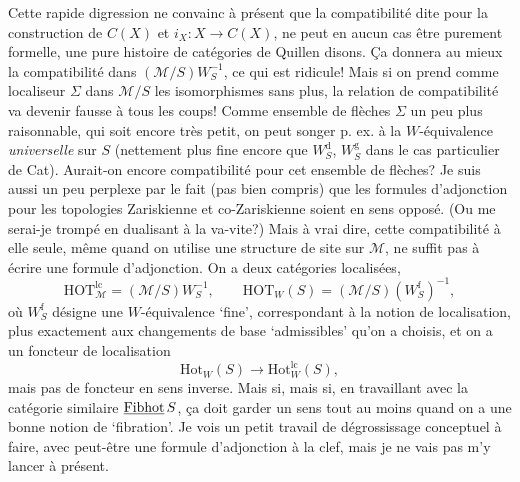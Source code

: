 Cette rapide digression ne convainc à présent que la compatibilité dite pour la construction de $C(X)$ et $i_X : X \longrightarrow C(X)$, ne peut en aucun cas être purement formelle, une pure histoire de catégories de Quillen disons. Ça donnera au mieux la compatibilité dans $(\mathcal{M}/S)W_S^{-1}$, ce qui est ridicule! Mais si on prend comme localiseur $\Sigma$ dans $\mathcal{M}/S$ les isomorphismes sans plus, la relation de compatibilité va devenir fausse à tous les coups! Comme ensemble de flèches $\Sigma$ un peu plus raisonnable, qui soit encore très petit, on peut songer p. ex. à la $W$-équivalence \textit{universelle} sur $S$ (nettement plus fine encore que $W_S^{\mathrm{d}}$, $W_S^{\mathrm{g}}$ dans le cas particulier de Cat). Aurait-on encore compatibilité pour cet ensemble de flèches? Je suis aussi un peu perplexe par le fait (pas bien compris) que les formules d’adjonction pour les topologies Zariskienne et co-Zariskienne soient en sens opposé. (Ou me serai-je trompé en dualisant à la va-vite?) Mais à vrai dire, cette compatibilité à elle seule, même quand on utilise une structure de site sur $\mathcal{M}$, ne suffit pas à écrire une formule d’adjonction. On a deux catégories localisées, %
\[
\mathrm{HOT}^{\mathrm{lc}}_{\mathcal{M}} = (\mathcal{M}/S)W_S^{-1}, \qquad \mathrm{HOT}_W(S) = (\mathcal{M}/S)(W_S^{\mathrm{f}})^{-1},
\]
où $W_S^{\mathrm{f}}$ désigne une $W$-équivalence ‘fine’, correspondant à la notion de localisation, plus exactement aux changements de base ‘admissibles’ qu’on a choisis, et on a un foncteur de localisation
\[
\mathrm{Hot}_W(S) \longrightarrow \mathrm{Hot}^{\mathrm{lc}}_{W}(S),
\]
mais pas de foncteur en sens inverse. Mais si, mais si, en travaillant avec la catégorie similaire $\underline{\mathrm{Fibhot}}\,S$, ça doit garder un sens tout au moins quand on a une bonne notion de ‘fibration’. Je vois un petit travail de dégrossissage conceptuel à faire, avec peut-être une formule d’adjonction à la clef, mais je ne vais pas m’y lancer à présent.

